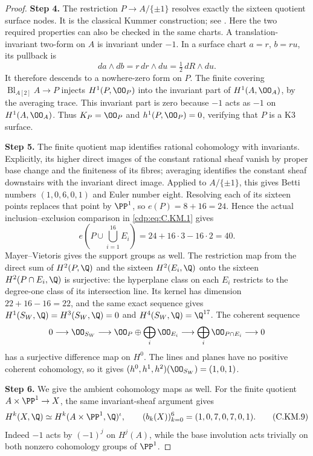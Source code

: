 \begin{proof}
\noindent\textbf{Step 4.} The restriction $P\to A/\{\pm1\}$ resolves exactly the
sixteen quotient surface nodes. It is the classical Kummer
construction; see \cite[Chapter~1, Example~1.3(iii)]{HuybrechtsK3Draft}.
Here the two required properties can also be checked in the
same charts. A translation-invariant two-form on $A$ is
invariant under $-1$. In a surface chart $a=r$, $b=ru$,
its pullback is
\[
                da\wedge db=r\,dr\wedge du
                            =\tfrac12\,dR\wedge du.   \tag{C.KM.7}\label{cdp:eq:C.KM.7}
\]
It therefore descends to a nowhere-zero form on $P$.
The finite covering $\operatorname{Bl}_{A[2]}A\to P$
injects $H^1(P,\OO_P)$ into the invariant part of
$H^1(A,\OO_A)$, by the averaging trace. This invariant
part is zero because $-1$ acts as $-1$ on $H^1(A,\OO_A)$.
Thus $K_P=\OO_P$ and $h^1(P,\OO_P)=0$, verifying that
$P$ is a K3 surface.

\noindent\textbf{Step 5.} The finite quotient map identifies rational cohomology with
invariants. Explicitly, its higher direct images of the
constant rational sheaf vanish by proper base change and
the finiteness of its fibres; averaging identifies the
constant sheaf downstairs with the invariant direct image.
Applied to $A/\{\pm1\}$, this gives Betti numbers
$(1,0,6,0,1)$ and Euler number eight. Resolving each of its
sixteen points replaces that point by $\PP^1$, so
$e(P)=8+16=24$. Hence the actual inclusion--exclusion
comparison in \eqref{cdp:eq:C.KM.1} gives
\[
          e\left(P\cup\bigcup_{i=1}^{16}E_i\right)
                    =24+16\cdot3-16\cdot2=40.          \tag{C.KM.8}\label{cdp:eq:C.KM.8}
\]
Mayer--Vietoris gives the support groups as well. The restriction
map from the direct sum of $H^2(P,\Q)$ and the sixteen
$H^2(E_i,\Q)$ onto the sixteen $H^2(P\cap E_i,\Q)$ is
surjective: the hyperplane class on each $E_i$ restricts to
the degree-one class of its intersection line. Its kernel
has dimension $22+16-16=22$, and the same exact sequence
gives $H^1(S_W,\Q)=H^3(S_W,\Q)=0$ and
$H^4(S_W,\Q)=\Q^{17}$. The coherent sequence
\[
 0\longrightarrow\OO_{S_W}\longrightarrow
 \OO_P\oplus\bigoplus_i\OO_{E_i}
 \longrightarrow\bigoplus_i\OO_{P\cap E_i}
 \longrightarrow0
\]
has a surjective difference map on $H^0$. The lines and planes
have no positive coherent cohomology, so it gives
$(h^0,h^1,h^2)(\OO_{S_W})=(1,0,1)$.

\noindent\textbf{Step 6.} We give the ambient cohomology maps as well. For the finite
quotient $A\times\PP^1\to X$, the same invariant-sheaf
argument gives
\[
 H^k(X,\Q)\simeq H^k(A\times\PP^1,\Q)^{\iota},
 \qquad (b_k(X))_{k=0}^6=(1,0,7,0,7,0,1).              \tag{C.KM.9}\label{cdp:eq:C.KM.9}
\]
Indeed $-1$ acts by $(-1)^j$ on $H^j(A)$, while the
base involution acts trivially on both nonzero cohomology
groups of $\PP^1$.


\end{proof}
